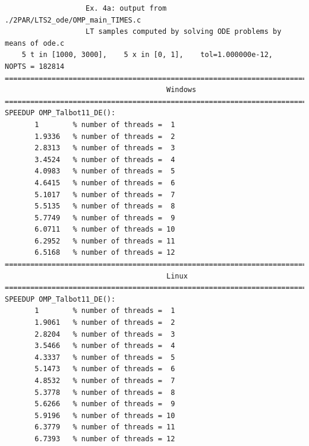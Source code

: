 \documentclass[a4paper,10pt]{report}%
\begin{document}
\begin{lstlisting}
                   Ex. 4a: output from ./2PAR/LTS2_ode/OMP_main_TIMES.c
                   LT samples computed by solving ODE problems by means of ode.c
    5 t in [1000, 3000],    5 x in [0, 1],    tol=1.000000e-12,    NOPTS = 182814
====================================================================================
                                      Windows
====================================================================================
SPEEDUP OMP_Talbot11_DE():
       1        % number of threads =  1
       1.9336   % number of threads =  2
       2.8313   % number of threads =  3
       3.4524   % number of threads =  4
       4.0983   % number of threads =  5
       4.6415   % number of threads =  6
       5.1017   % number of threads =  7
       5.5135   % number of threads =  8
       5.7749   % number of threads =  9
       6.0711   % number of threads = 10
       6.2952   % number of threads = 11
       6.5168   % number of threads = 12
====================================================================================
                                      Linux
====================================================================================
SPEEDUP OMP_Talbot11_DE():
       1        % number of threads =  1
       1.9061   % number of threads =  2
       2.8204   % number of threads =  3
       3.5466   % number of threads =  4
       4.3337   % number of threads =  5
       5.1473   % number of threads =  6
       4.8532   % number of threads =  7
       5.3778   % number of threads =  8
       5.6266   % number of threads =  9
       5.9196   % number of threads = 10
       6.3779   % number of threads = 11
       6.7393   % number of threads = 12


\end{lstlisting}
\end{document}

